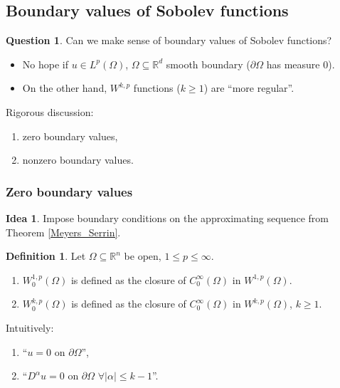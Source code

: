 \documentclass[12pt]{article}
\theoremstyle{definition}
\newtheorem*{definition*}{Definition}
\newtheorem*{idea}{Idea}
\newtheorem*{question}{Question}
\begin{document}
\subsection{Boundary values of Sobolev functions}
\begin{question}
Can we make sense of boundary values of Sobolev functions?
\end{question}

\begin{itemize}
\item No hope if $u\in L^p(\Omega)$, $\Omega\subseteq\mathbb{R}^d$ smooth boundary ($\partial\Omega$ has measure $0$).

\item On the other hand, $W^{k,p}$ functions ($k\geq1$) are ``more regular''.
\end{itemize}

Rigorous discussion:
\begin{enumerate}[label=\alph*)]
\item zero boundary values,
\item nonzero boundary values.
\end{enumerate}

\subsubsection{Zero boundary values}
\begin{idea}
Impose boundary conditions on the approximating sequence from Theorem \ref{Meyers_Serrin}.
\end{idea}

\begin{definition*}
Let $\Omega\subseteq\mathbb{R}^n$ be open, $1\leq p\leq\infty$.

\begin{enumerate}[label=(\roman*)]
\item $W_0^{1,p}(\Omega)$ is defined as the closure of $C_0^{\infty}(\Omega)$ in $W^{1,p}(\Omega)$.

\item $W_0^{k,p}(\Omega)$ is defined as the closure of $C_0^{\infty}(\Omega)$ in $W^{k,p}(\Omega)$, $k\geq1$.
\end{enumerate}
\end{definition*}

Intuitively:
\begin{enumerate}[label=(\roman*)]
\item ``$u=0$ on $\partial\Omega$'',
\item ``$D^{\alpha}u=0$ on $\partial\Omega$ $\forall|\alpha|\leq k-1$''.
\end{enumerate}
\end{document}
